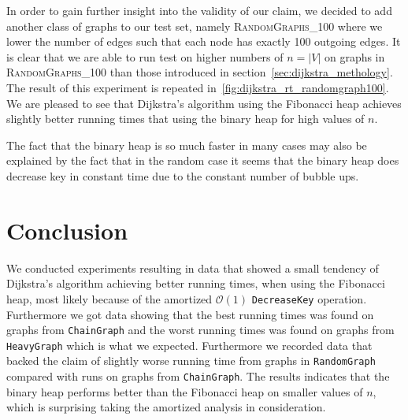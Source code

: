 \documentclass[a4paper,oneside,article,11pt]{memoir}
\begin{document}
In order to gain further insight into the validity of our claim, we decided to add another class of graphs to our test set, namely \textsc{RandomGraphs\_100} where we lower the number of edges such that each node has exactly 100 outgoing edges. It is clear that we are able to run test on higher numbers of $n = \lvert V \lvert$ on graphs in \textsc{RandomGraphs\_100} than those introduced in section~\ref{sec:dijkstra_methology}. The result of this experiment is repeated in~\ref{fig:dijkstra_rt_randomgraph100}. We are pleased to see that Dijkstra's algorithm using the Fibonacci heap achieves slightly better running times that using the binary heap for high values of $n$.

The fact that the binary heap is so much faster in many cases may also be explained by the fact that in the random case it seems that the binary heap does decrease key in constant time due to the constant number of bubble ups.

\section{Conclusion}
We conducted experiments resulting in data that showed a small tendency of Dijkstra's algorithm achieving better running times, when using the Fibonacci heap, most likely because of the amortized $\mathcal{O}(1)$ \texttt{DecreaseKey} operation. Furthermore we got data showing that the best running times was found on graphs from \texttt{ChainGraph} and the worst running times was found on graphs from \texttt{HeavyGraph} which is what we expected. Furthermore we recorded data that backed the claim of slightly worse running time from graphs in \texttt{RandomGraph} compared with runs on graphs from \texttt{ChainGraph}. The results indicates that the binary heap performs better than the Fibonacci heap on smaller values of $n$, which is surprising taking the amortized analysis in consideration.


\end{document}
